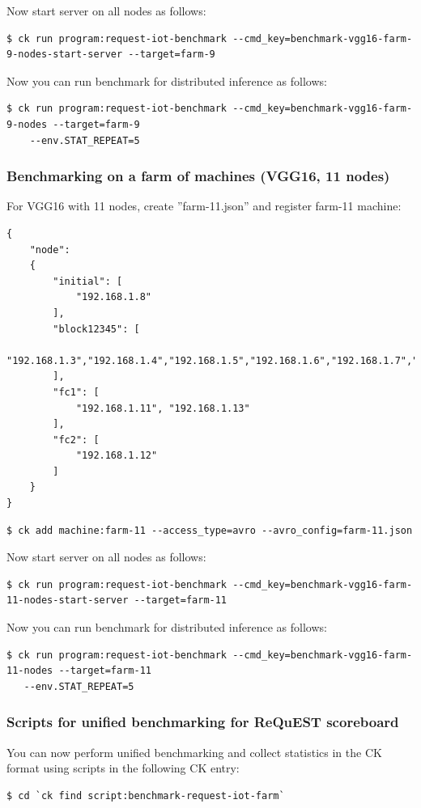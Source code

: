 \documentclass[sigplan]{acmart}
\begin{document}
Now start server on all nodes as follows:
\begin{verbatim}
$ ck run program:request-iot-benchmark --cmd_key=benchmark-vgg16-farm-9-nodes-start-server --target=farm-9 
\end{verbatim}
Now you can run benchmark for distributed inference as follows:
\begin{verbatim}
$ ck run program:request-iot-benchmark --cmd_key=benchmark-vgg16-farm-9-nodes --target=farm-9
    --env.STAT_REPEAT=5
\end{verbatim}

\subsubsection{Benchmarking on a farm of machines (VGG16, 11 nodes)}

For VGG16 with 11 nodes, create ''farm-11.json'' and register farm-11 machine:
\begin{verbatim}
{
    "node":
    {
        "initial": [
            "192.168.1.8"
        ],
        "block12345": [
            "192.168.1.3","192.168.1.4","192.168.1.5","192.168.1.6","192.168.1.7","192.168.1.9","192.168.1.10"
        ],
        "fc1": [
            "192.168.1.11", "192.168.1.13"
        ],
        "fc2": [
            "192.168.1.12"
        ]
    }
}
\end{verbatim}

\begin{verbatim}
$ ck add machine:farm-11 --access_type=avro --avro_config=farm-11.json
\end{verbatim}

Now start server on all nodes as follows:
\begin{verbatim}
$ ck run program:request-iot-benchmark --cmd_key=benchmark-vgg16-farm-11-nodes-start-server --target=farm-11 
\end{verbatim}
Now you can run benchmark for distributed inference as follows:
\begin{verbatim}
$ ck run program:request-iot-benchmark --cmd_key=benchmark-vgg16-farm-11-nodes --target=farm-11
   --env.STAT_REPEAT=5
\end{verbatim}

\subsubsection{Scripts for unified benchmarking for ReQuEST scoreboard}

You can now perform unified benchmarking and collect statistics in the CK format using scripts in the following CK entry:
\begin{verbatim}
$ cd `ck find script:benchmark-request-iot-farm`
\end{verbatim}
\end{document}
